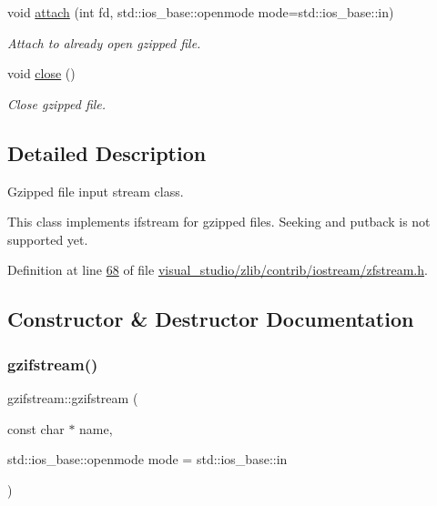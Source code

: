 \begin{DoxyCompactItemize}
void \hyperlink{classgzifstream_a24aff901c395acbdaddb7878f4ddb7aa}{attach} (int fd, std\+::ios\+\_\+base\+::openmode mode=std\+::ios\+\_\+base\+::in)
\begin{DoxyCompactList}\small\item\em Attach to already open gzipped file. \end{DoxyCompactList}\item 
void \hyperlink{classgzifstream_a073fadd9dc90195c47a6ae2d863c8ace}{close} ()
\begin{DoxyCompactList}\small\item\em Close gzipped file. \end{DoxyCompactList}\end{DoxyCompactItemize}


\subsection{Detailed Description}
Gzipped file input stream class. 

This class implements ifstream for gzipped files. Seeking and putback is not supported yet. 

Definition at line \hyperlink{visual__studio_2zlib_2contrib_2iostream_2zfstream_8h_source_l00068}{68} of file \hyperlink{visual__studio_2zlib_2contrib_2iostream_2zfstream_8h_source}{visual\+\_\+studio/zlib/contrib/iostream/zfstream.\+h}.



\subsection{Constructor \& Destructor Documentation}
\mbox{\label{classgzifstream_a90f6e0eea83b7ce3c64f755b51b5b011}} 
\subsubsection{\texorpdfstring{gzifstream()}{gzifstream()}\hspace{0.1cm}{\footnotesize\ttfamily [1/4]}}
{\footnotesize\ttfamily gzifstream\+::gzifstream (\begin{DoxyParamCaption}\item[{const char $\ast$}]{name,  }\item[{std\+::ios\+\_\+base\+::openmode}]{mode = {\ttfamily std\+:\+:ios\+\_\+base\+:\+:in} }\end{DoxyParamCaption})\hspace{0.3cm}{\ttfamily [explicit]}}



